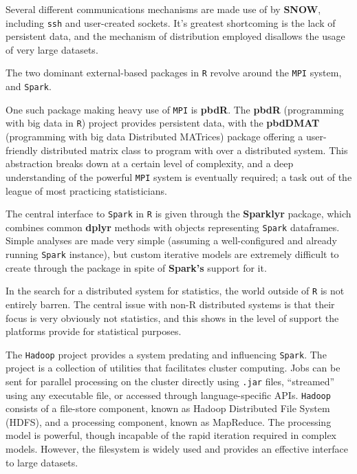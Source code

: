

Several different communications mechanisms are made use of by \textbf{SNOW}, including \texttt{ssh} and user-created sockets.
It's greatest shortcoming is the lack of persistent data, and the mechanism of distribution employed disallows the usage of very large datasets.

The two dominant external-based packages in \texttt{R} revolve around the \texttt{MPI} system, and \texttt{Spark}.

One such package making heavy use of \texttt{MPI} is \textbf{pbdR}\cite{pbdR2012}.
The \textbf{pbdR} (programming with big data in \texttt{R}) project provides persistent data, with the \textbf{pbdDMAT} (programming with big data Distributed MATrices) package offering a user-friendly distributed matrix class to program with over a distributed system\cite{pbdDMATpackage}.
This abstraction breaks down at a certain level of complexity, and a deep understanding of the powerful \texttt{MPI} system is eventually required; a task out of the league of most practicing statisticians.

The central interface to \texttt{Spark} in \texttt{R} is given through the \textbf{Sparklyr} package, which combines common \textbf{dplyr} methods with objects representing \texttt{Spark} dataframes\cite{luraschi20}.
Simple analyses are made very simple (assuming a well-configured and already running \texttt{Spark} instance), but custom iterative models are extremely difficult to create through the package in spite of \textbf{Spark's} support for it.

In the search for a distributed system for statistics, the world outside of \texttt{R} is not entirely barren.
The central issue with non-R distributed systems is that their focus is very obviously not statistics, and this shows in the level of support the platforms provide for statistical purposes.

The \texttt{Hadoop} project provides a system predating and influencing \texttt{Spark}\cite{shvachko2010hadoop}.
The project is a collection of utilities that facilitates cluster computing.
Jobs can be sent for parallel processing on the cluster directly using \texttt{.jar} files, ``streamed'' using any executable file, or accessed through language-specific APIs.
\texttt{Hadoop} consists of a file-store component, known as Hadoop Distributed File System (HDFS), and a processing component, known as MapReduce.
The processing model is powerful, though incapable of the rapid iteration required in complex models\cite{zaharia2010spark}.
However, the filesystem is widely used and provides an effective interface to large datasets.

